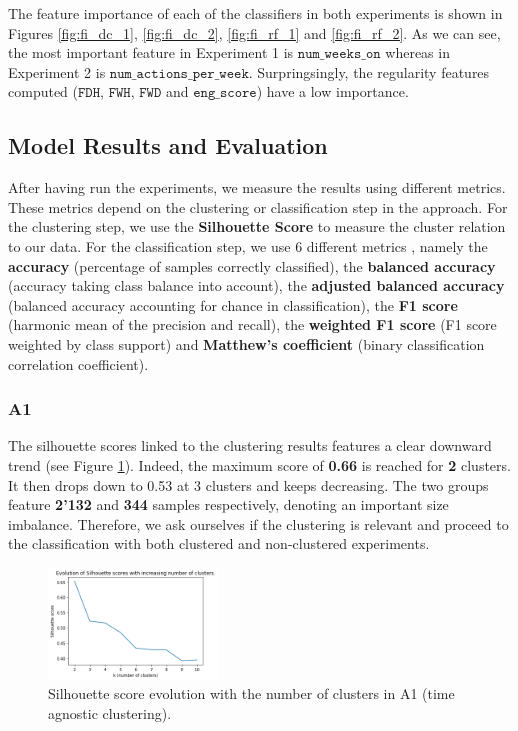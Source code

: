 \documentclass[sigplan,screen]{acmart}
\begin{document}
The feature importance of each of the classifiers in both experiments is shown in Figures \ref{fig:fi_dc_1},
\ref{fig:fi_dc_2}, \ref{fig:fi_rf_1} and \ref{fig:fi_rf_2}. As we can see, the most important feature in Experiment 1 is $\texttt{num\_weeks\_on}$ whereas in Experiment 2 is $\texttt{num\_actions\_per\_week}$. Surpringsingly, the regularity features computed ($\texttt{FDH}$, $\texttt{FWH}$, $\texttt{FWD}$ and $\texttt{eng\_score}$) have a low importance.

\subsection{Model Results and Evaluation}\label{subsec:eval_results}

After having run the experiments, we measure the results using different metrics. These metrics depend on the clustering or classification step in the approach. For the clustering step, we use the \textbf{Silhouette Score} to measure the cluster relation to our data. For the classification step, we use 6 different metrics \cite{scikit-learn}, namely the \textbf{accuracy} (percentage of samples correctly classified), the \textbf{balanced accuracy} (accuracy taking class balance into account), the \textbf{adjusted balanced accuracy} (balanced accuracy accounting for chance in classification), the \textbf{F1 score} (harmonic mean of the precision and recall), the \textbf{weighted F1 score} (F1 score weighted by class support) and \textbf{Matthew's coefficient} (binary classification correlation coefficient).

\subsubsection{A1}

The silhouette scores linked to the clustering results features a clear downward trend (see Figure \ref{fig:A1_clustering_silhouette}). Indeed, the maximum score of \textbf{0.66} is reached for \textbf{2} clusters. It then drops down to 0.53 at 3 clusters and keeps decreasing. The two groups feature \textbf{2'132} and \textbf{344} samples respectively, denoting an important size imbalance. Therefore, we ask ourselves if the clustering is relevant and proceed to the classification with both clustered and non-clustered experiments.

\begin{figure}[h]
    \centering
    \includegraphics[width=0.4\textwidth]{reports/figures/A1_clustering_kmeans.png}
    \caption{Silhouette score evolution with the number of clusters in A1 (time agnostic clustering).}
    \label{fig:A1_clustering_silhouette}
\end{figure}
\end{document}
